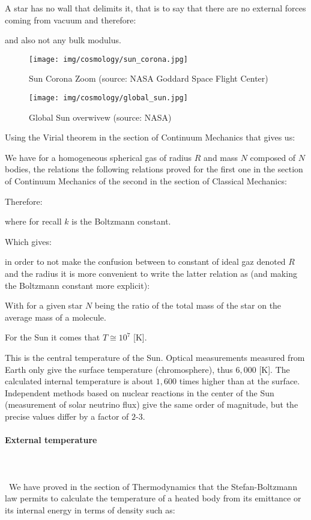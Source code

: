 	A star has no wall that delimits it, that is to say that there are no external forces coming from vacuum and therefore:
	
	and also not any bulk modulus.
	\begin{figure}[H]
		\begin{center}
		\texttt{[image: img/cosmology/sun\_corona.jpg]}
		\end{center}	
		\caption{Sun Corona Zoom (source: NASA Goddard Space Flight Center)}
	\end{figure}
	\begin{figure}[H]
		\begin{center}
		\texttt{[image: img/cosmology/global\_sun.jpg]}
		\end{center}	
		\caption{Global Sun overwivew (source: NASA)}
	\end{figure}
		
	Using the Virial theorem in the section of Continuum Mechanics that gives us:
	
	We have for a homogeneous spherical gas of radius $R$ and mass $N$ composed of $N$ bodies, the relations the following relations proved for the first one in the section of Continuum Mechanics of the second in the section of Classical Mechanics:
	
	Therefore:
	
	where for recall $k$ is the Boltzmann constant.

	Which gives:
	
	in order to not make the confusion between to constant of ideal gaz denoted $R$ and the radius it is more convenient to write the latter relation as (and making the Boltzmann constant more explicit):
	
	With for a given star $N$ being the ratio of the total mass of the star on the average mass of a molecule.
	
	For the Sun it comes that $T\cong 10^7$ [K].
	
	This is the central temperature of the Sun. Optical measurements measured from Earth only give the surface temperature (chromosphere), thus $6,000$ [K]. The calculated internal temperature is about $1,600$ times higher than at the surface. Independent methods based on nuclear reactions in the center of the Sun (measurement of solar neutrino flux) give the same order of magnitude, but the precise values differ by a factor of $2$-$3$.
	
	\paragraph{External temperature}\mbox{}\\\\\
	We have proved in the section of Thermodynamics that the Stefan-Boltzmann law permits to calculate the temperature of a heated body from its emittance or its internal energy in terms of density such as:
	
